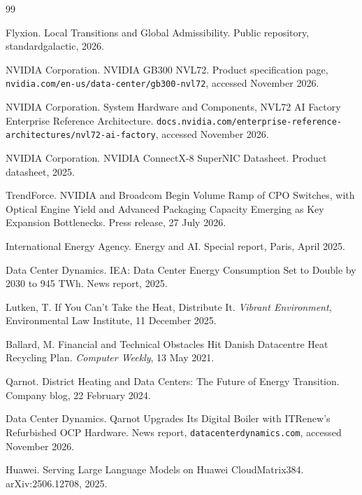 \documentclass[11pt,openany]{book}
\theoremstyle{remark}
\begin{document}
\begingroup\small
\begin{thebibliography}{99}
\setlength{\itemsep}{0pt}

Flyxion.
\newblock Local Transitions and Global Admissibility.
\newblock Public repository, standardgalactic, 2026.

NVIDIA Corporation.
\newblock NVIDIA GB300 NVL72.
\newblock Product specification page, \texttt{nvidia.com/en-us/data-center/gb300-nvl72}, accessed November 2026.

NVIDIA Corporation.
\newblock System Hardware and Components, NVL72 AI Factory Enterprise Reference Architecture.
\newblock \texttt{docs.nvidia.com/enterprise-reference-architectures/nvl72-ai-factory}, accessed November 2026.

NVIDIA Corporation.
\newblock NVIDIA ConnectX-8 SuperNIC Datasheet.
\newblock Product datasheet, 2025.

TrendForce.
\newblock NVIDIA and Broadcom Begin Volume Ramp of CPO Switches, with Optical Engine Yield and Advanced Packaging Capacity Emerging as Key Expansion Bottlenecks.
\newblock Press release, 27 July 2026.

International Energy Agency.
\newblock Energy and AI.
\newblock Special report, Paris, April 2025.

Data Center Dynamics.
\newblock IEA: Data Center Energy Consumption Set to Double by 2030 to 945 TWh.
\newblock News report, 2025.

Lutken, T.
\newblock If You Can't Take the Heat, Distribute It.
\newblock \emph{Vibrant Environment}, Environmental Law Institute, 11 December 2025.

Ballard, M.
\newblock Financial and Technical Obstacles Hit Danish Datacentre Heat Recycling Plan.
\newblock \emph{Computer Weekly}, 13 May 2021.

Qarnot.
\newblock District Heating and Data Centers: The Future of Energy Transition.
\newblock Company blog, 22 February 2024.

Data Center Dynamics.
\newblock Qarnot Upgrades Its Digital Boiler with ITRenew's Refurbished OCP Hardware.
\newblock News report, \texttt{datacenterdynamics.com}, accessed November 2026.

Huawei.
\newblock Serving Large Language Models on Huawei CloudMatrix384.
\newblock arXiv:2506.12708, 2025.


\end{thebibliography}
\end{document}
